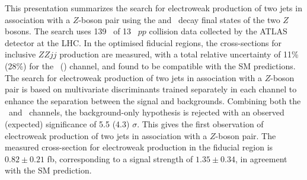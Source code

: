This presentation summarizes the search for electroweak production of two jets in association with a $Z$-boson pair using the \llll and \llvv~decay final states of the two $Z$ bosons. The search uses 139 \ifb~of 13 \TeV~$pp$ collision data collected by the ATLAS detector at the LHC. In the optimised fiducial regions, the cross-sections for inclusive $ZZjj$ production are measured, with a total relative uncertainty of 11\% (28\%) for the \lllljj~(\llvvjj) channel, and found to be compatible with the SM predictions.
The search for electroweak production of two jets in association with a $Z$-boson pair is based on multivariate discriminants trained separately in each channel to enhance the separation between the signal and backgrounds. Combining both the \lllljj~and \llvvjj~channels, the background-only hypothesis is rejected with an observed (expected) significance of 5.5 (4.3) $\sigma$.
This gives the first observation of electroweak production of two jets in association with a $Z$-boson pair.
The measured cross-section for electroweak production in the fiducial region is $0.82\pm0.21$ fb,
corresponding to a signal strength of $1.35\pm0.34$, in agreement with the SM prediction.
